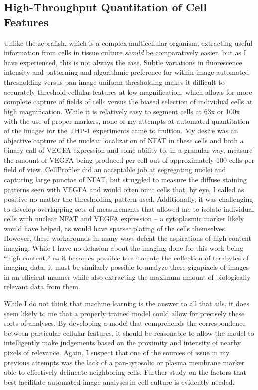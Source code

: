 \subsection{High\hyp{}Throughput Quantitation of Cell Features}\label{measurecells}

Unlike the zebrafish, which is a complex multicellular organism, extracting useful information from cells in tissue culture \textit{should} be comparatively easier, but as I have experienced, this is not always the case. Subtle variations in fluorescence intensity and patterning and algorithmic preference for within\hyp{}image automated thresholding versus pan\hyp{}image uniform thresholding makes it difficult to accurately threshold cellular features at low magnification, which allows for more complete capture of fields of cells versus the biased selection of individual cells at high magnification. While it is relatively easy to segment cells at 63x or 100x with the use of proper markers, none of my attempts at automated quantitation of the images for the THP\hyp{}1 experiments came to fruition. My desire was an objective capture of the nuclear localization of NFAT in these cells and both a binary call of VEGFA expression and some ability to, in a granular way, measure the amount of VEGFA being produced per cell out of approximately 100 cells per field of view. CellProfiler \citep{Carpenter2006, Kamentsky2011, McQuin2018, Stirling2021} did an acceptable job at segregating nuclei and capturing large punctae of NFAT, but struggled to measure the diffuse staining patterns seen with VEGFA and would often omit cells that, by eye, I called as positive no matter the thresholding pattern used. Additionally, it was challenging to develop overlapping sets of measurements that allowed me to isolate individual cells with nuclear NFAT and VEGFA expression -- a cytoplasmic marker likely would have helped, as would have sparser plating of the cells themselves. However, these workarounds in many ways defeat the aspirations of high\hyp{}content imaging. While I have no delusion about the imaging done for this work being ``high content,'' as it becomes possible to automate the collection of terabytes of imaging data, it must be similarly possible to analyze these gigapixels of images in an efficient manner while also extracting the maximum amount of biologically relevant data from them.

While I do not think that machine learning is the answer to all that ails, it does seem likely to me that a properly trained model could allow for precisely these sorts of analyses. By developing a model that comprehends the correspondence between particular cellular features, it should be reasonable to allow the model to intelligently make judgements based on the proximity and intensity of nearby pixels of relevance. Again, I suspect that one of the sources of issue in my previous attempts was the lack of a pan\hyp{}cytosolic or plasma membrane marker able to effectively delineate neighboring cells. Further study on the factors that best facilitate automated image analyses in cell culture is evidently needed.

